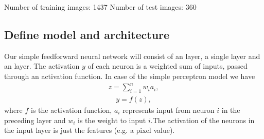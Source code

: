 \documentclass[letterpaper,10pt,english]{sphinxmanual}
\begin{document}
\begin{sphinxVerbatim}[commandchars=\\\{\}]
        


  
  
\end{sphinxVerbatim}

\begin{sphinxVerbatim}[commandchars=\\\{\}]
Number of training images: 1437
Number of test images: 360
\end{sphinxVerbatim}


\subsection{Define model and architecture}
\label{\detokenize{chapter6:define-model-and-architecture}}
Our simple feed\sphinxhyphen{}forward neural network will consist of an  layer, a single  layer and an  layer. The activation \(y\) of each neuron is a weighted sum of inputs, passed through an activation function. In case of the simple perceptron model we have
\begin{equation*}
\begin{split} z = \sum_{i=1}^n w_i a_i ,\end{split}
\end{equation*}\begin{equation*}
\begin{split} y = f(z) ,\end{split}
\end{equation*}
where \(f\) is the activation function, \(a_i\) represents input from neuron \(i\) in the preceding layer
and \(w_i\) is the weight to input \(i\).The activation of the neurons in the input layer is just the features (e.g. a pixel value).
\end{document}
